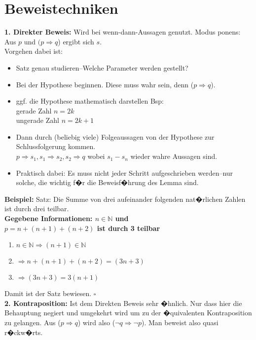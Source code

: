 \section*{Beweistechniken}
\textbf{1. Direkter Beweis:} Wird bei wenn-dann-Aussagen genutzt. Modus ponens: Aus $p$ und $(p \Rightarrow q$) ergibt sich $s$.\\
Vorgehen dabei ist:\\
\begin{itemize}
  \item Satz genau studieren--Welche Parameter werden gestellt?
  \item Bei der Hypothese beginnen. Diese muss wahr sein, denn ($p \Rightarrow q$).
  \item ggf. die Hypothese mathematisch darstellen Bsp:\\
    gerade Zahl $n = 2k$\\
    ungerade Zahl $n = 2k + 1$
  \item Dann durch (beliebig viele) Folgeaussagen von der Hypothese zur Schlussfolgerung kommen.\\
  $p \Rightarrow s_1, s_1 \Rightarrow s_2, s_2 \Rightarrow q$ wobei $s_1 - s_n$ wieder wahre Aussagen sind.
  \item Praktisch dabei: Es muss nicht jeder Schritt aufgeschrieben werden--nur solche, die wichtig f�r die Beweisf�hrung des Lemma sind.
\end{itemize}

\textbf{Beispiel:}
Satz: \glqq Die Summe von drei aufeinander folgenden nat�rlichen Zahlen ist durch drei teilbar.\grqq\\
\textbf{Gegebene Informationen: $n \in \mathbb{N}$ und\\
$p = n + (n+1) + (n+2)$ ist durch 3 teilbar}
\begin{enumerate}
  \item $n \in \mathbb{N} \Rightarrow (n+1) \in \mathbb{N}$
  \item $\Rightarrow n + (n+1) + (n+2) = (3n + 3)$
  \item $\Rightarrow (3n + 3) = 3(n + 1)$
\end{enumerate}
Damit ist der Satz bewiesen. $\square$
\\
\textbf{2. Kontraposition:} Ist dem Direkten Beweis sehr �hnlich. Nur dass hier die Behauptung negiert und umgekehrt wird um zu der �quivalenten Kontraposition zu gelangen. Aus ($p \Rightarrow q$) wird also ($\neg q \Rightarrow \neg p$). Man beweist also quasi r�ckw�rts.

